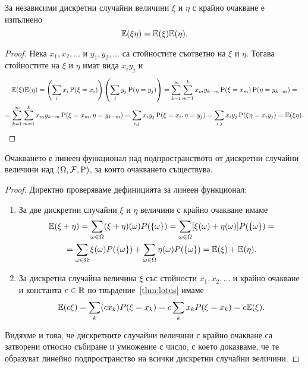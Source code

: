 \documentclass[numbers=endperiod, DIV=15, bibliography=totocnumbered]{scrartcl}
\begin{document}
\begin{proposition}\label{thm:expect-product}
  За независими дискретни случайни величини $\xi$ и $\eta$ с крайно очакване е изпълнено
  \begin{displaymath}
    \mathbb{E}(\xi \eta) = \mathbb{E}(\xi) \mathbb{E}(\eta).
  \end{displaymath}
\end{proposition}
\begin{proof}
  Нека $x_1, x_2, \ldots$ и $y_1, y_2, \ldots$ са стойностите съответно на $\xi$ и $\eta$. Тогава стойностите на $\xi$ и $\eta$ имат вида $x_i y_j$ и
  \begin{multline*}
    \mathbb{E}(\xi) \mathbb{E}(\eta)
    =
    \left( \sum_i x_i \operatorname{P}(\xi = x_i) \right) \left( \sum_j y_j \operatorname{P}(\eta = y_j) \right)
    =
    \sum_{k=1}^\infty \sum_{m=1}^k x_m y_{k-m} \operatorname{P}(\xi = x_m) \operatorname{P}(\eta = y_{k-m})
    = \\ =
    \sum_{k=1}^\infty \sum_{m=1}^k x_m y_{k-m} \operatorname{P}(\xi = x_m, \eta = y_{k-m})
    =
    \sum_{i, j} x_i y_j \operatorname{P}(\xi = x_i, \eta = y_j)
    =
    \sum_{i, j} x_i y_j \operatorname{P}(\xi \eta = x_i y_j)
    =
    \mathbb{E}(\xi \eta).
  \end{multline*}
\end{proof}

\begin{proposition}\label{thm:expect-linear}
  Очакването е линеен функционал над подпространството от дискретни случайни величини над $(\Omega, \mathcal{F}, \operatorname{P})$, за които очакването съществува.
\end{proposition}
\begin{proof}
  Директно проверяваме дефиницията за линеен функционал:
  \begin{enumerate}
    \item За две дискретни случайни $\xi$ и $\eta$ величини с крайно очакване имаме
    \begin{multline*}
      \mathbb{E}(\xi + \eta)
      =
      \sum_{\omega \in \Omega} (\xi + \eta) (\omega) P(\{ \omega \})
      =
      \sum_{\omega \in \Omega} [\xi (\omega) + \eta (\omega)] P(\{ \omega \})
      = \\ =
      \sum_{\omega \in \Omega} \xi (\omega) P(\{ \omega \}) + \sum_{\omega \in \Omega} \eta (\omega) P(\{ \omega \})
      =
      \mathbb{E}(\xi) + \mathbb{E}(\eta).
    \end{multline*}

    \item За дискретна случайна величина $\xi$ със стойности $x_1, x_2, \ldots$ и крайно очакване и константа $c \in \mathbb{R}$ по твърдение~\ref{thm:lotus} имаме
    \begin{displaymath}
      \mathbb{E}(c \xi)
      =
      \sum_k (c x_k) P(\xi = x_k)
      =
      c \sum_k x_k P(\xi = x_k)
      =
      c \mathbb{E}(\xi).
    \end{displaymath}
  \end{enumerate}

  Видяхме и това, че дискретните случайни величини с крайно очакване са затворени относно събиране и умножение с число, с което доказваме, че те образуват линейно подпространство на всички дискретни случайни величини.
\end{proof}
\end{document}
